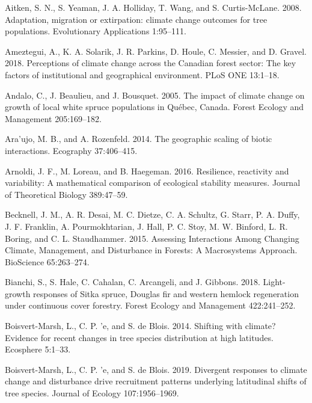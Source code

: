 \documentclass[12pt]{article}
\newlength{\cslhangindent}
\newenvironment{cslreferences}%
  {\setlength{\parindent}{0pt}%
  \everypar{\setlength{\hangindent}{\cslhangindent}}\ignorespaces}%
  {\par}
\begin{document}
\hypertarget{refs}{}
\begin{cslreferences}
\leavevmode\hypertarget{ref-Aitken2008}{}%
Aitken, S. N., S. Yeaman, J. A. Holliday, T. Wang, and S. Curtis-McLane.
2008. Adaptation, migration or extirpation: climate change outcomes for
tree populations. Evolutionary Applications 1:95--111.

\leavevmode\hypertarget{ref-Ameztegui2018}{}%
Ameztegui, A., K. A. Solarik, J. R. Parkins, D. Houle, C. Messier, and
D. Gravel. 2018. Perceptions of climate change across the Canadian
forest sector: The key factors of institutional and geographical
environment. PLoS ONE 13:1--18.

\leavevmode\hypertarget{ref-Andalo2005}{}%
Andalo, C., J. Beaulieu, and J. Bousquet. 2005. The impact of climate
change on growth of local white spruce populations in Québec, Canada.
Forest Ecology and Management 205:169--182.

\leavevmode\hypertarget{ref-Araujo2014a}{}%
Ara\a'ujo, M. B., and A. Rozenfeld. 2014. The geographic scaling of
biotic interactions. Ecography 37:406--415.

\leavevmode\hypertarget{ref-Arnoldi2016}{}%
Arnoldi, J. F., M. Loreau, and B. Haegeman. 2016. Resilience, reactivity
and variability: A mathematical comparison of ecological stability
measures. Journal of Theoretical Biology 389:47--59.

\leavevmode\hypertarget{ref-Becknell2015a}{}%
Becknell, J. M., A. R. Desai, M. C. Dietze, C. A. Schultz, G. Starr, P.
A. Duffy, J. F. Franklin, A. Pourmokhtarian, J. Hall, P. C. Stoy, M. W.
Binford, L. R. Boring, and C. L. Staudhammer. 2015. Assessing
Interactions Among Changing Climate, Management, and Disturbance in
Forests: A Macrosystems Approach. BioScience 65:263--274.

\leavevmode\hypertarget{ref-Bianchi2018}{}%
Bianchi, S., S. Hale, C. Cahalan, C. Arcangeli, and J. Gibbons. 2018.
Light-growth responses of Sitka spruce, Douglas fir and western hemlock
regeneration under continuous cover forestry. Forest Ecology and
Management 422:241--252.

\leavevmode\hypertarget{ref-BoisvertMarsh2014}{}%
Boisvert-Marsh, L., C. P. \a'e, and S. de Blois. 2014. Shifting with
climate? Evidence for recent changes in tree species distribution at
high latitudes. Ecosphere 5:1--33.

\leavevmode\hypertarget{ref-BoisvertMarsh2019}{}%
Boisvert-Marsh, L., C. P. \a'e, and S. de Blois. 2019. Divergent
responses to climate change and disturbance drive recruitment patterns
underlying latitudinal shifts of tree species. Journal of Ecology
107:1956--1969.


\end{cslreferences}
\end{document}
